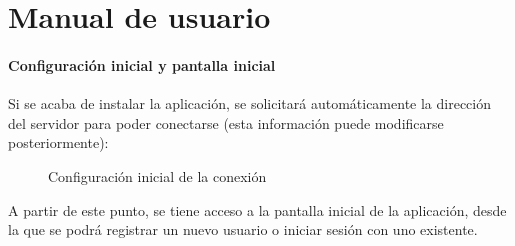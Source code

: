\chapter{Manual de usuario}

\subsubsection{Configuración inicial y pantalla inicial}

Si se acaba de instalar la aplicación, se solicitará automáticamente la dirección del servidor para poder conectarse (esta información puede modificarse posteriormente):

\begin{figure} [!htb]
	\centering
	\caption{Configuración inicial de la conexión}
	\label{fig:confIniCon}
\end{figure}

A partir de este punto, se tiene acceso a la pantalla inicial de la aplicación, desde la que se podrá registrar un nuevo usuario o iniciar sesión con uno existente.

